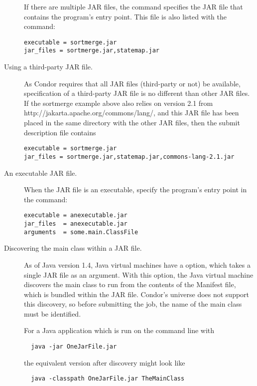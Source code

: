 \begin{description}
If there are multiple JAR files,
the  command specifies the JAR file
that contains the program's entry point.
This file is also listed with the  command:
\begin{verbatim}
executable = sortmerge.jar
jar_files = sortmerge.jar,statemap.jar
\end{verbatim}

\item[Using a third-party JAR file.]
As Condor requires that all JAR files (third-party or not)
be available,
specification of a third-party JAR file is no different than
other JAR files.
If the sortmerge example above also relies on
version 2.1 from http://jakarta.apache.org/commons/lang/,
and this JAR file has been placed in the same directory with
the other JAR files, then the submit description file contains
\footnotesize
\begin{verbatim}
executable = sortmerge.jar
jar_files = sortmerge.jar,statemap.jar,commons-lang-2.1.jar
\end{verbatim}
\normalsize

\item[An executable JAR file.]
When the JAR file is an executable, 
specify the program's entry point in the 
command:
\begin{verbatim}
executable = anexecutable.jar
jar_files  = anexecutable.jar
arguments  = some.main.ClassFile
\end{verbatim}

\item[Discovering the main class within a JAR file.]
As of Java version 1.4, 
Java virtual machines have a  option,
which takes a single JAR file as an argument.
With this option, 
the Java virtual machine discovers the main class to run 
from the contents of the Manifest file,
which is bundled within the JAR file.  
Condor's  universe does not support this discovery,
so before submitting the job,
the name of the main class must be identified.

For a Java application which is run on the command line with

\begin{verbatim}
  java -jar OneJarFile.jar
\end{verbatim}

the equivalent version after discovery might look like

\begin{verbatim}
  java -classpath OneJarFile.jar TheMainClass
\end{verbatim}


\end{description}
